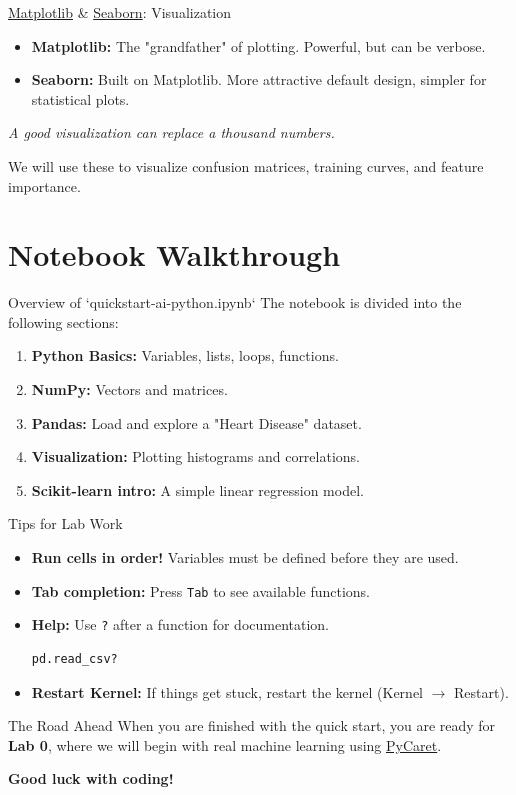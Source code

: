 \documentclass[aspectratio=169]{beamer}
\begin{document}
\begin{frame}{\href{https://matplotlib.org/}{Matplotlib} \& \href{https://seaborn.pydata.org/}{Seaborn}: Visualization}
    \begin{itemize}
        \item \textbf{Matplotlib:} The "grandfather" of plotting. Powerful, but can be verbose.
        \item \textbf{Seaborn:} Built on Matplotlib. More attractive default design, simpler for statistical plots.
    \end{itemize}
    
    \begin{center}
        \textit{A good visualization can replace a thousand numbers.}
    \end{center}
    We will use these to visualize confusion matrices, training curves, and feature importance.
\end{frame}

\section{Notebook Walkthrough}
\begin{frame}{Overview of `quickstart-ai-python.ipynb`}
    The notebook is divided into the following sections:
    \begin{enumerate}
        \item \textbf{Python Basics:} Variables, lists, loops, functions.
        \item \textbf{NumPy:} Vectors and matrices.
        \item \textbf{Pandas:} Load and explore a "Heart Disease" dataset.
        \item \textbf{Visualization:} Plotting histograms and correlations.
        \item \textbf{Scikit-learn intro:} A simple linear regression model.
    \end{enumerate}
\end{frame}

\begin{frame}[fragile]{Tips for Lab Work}
    \begin{itemize}
        \item \textbf{Run cells in order!} Variables must be defined before they are used.
        \item \textbf{Tab completion:} Press \texttt{Tab} to see available functions.
        \item \textbf{Help:} Use \texttt{?} after a function for documentation.
        \begin{lstlisting}[language=Python]
pd.read_csv?
        \end{lstlisting}
        \item \textbf{Restart Kernel:} If things get stuck, restart the kernel (Kernel $\rightarrow$ Restart).
    \end{itemize}
\end{frame}

\begin{frame}{The Road Ahead}
    When you are finished with the quick start, you are ready for \textbf{Lab 0}, where we will begin with real machine learning using \href{https://pycaret.org/}{PyCaret}.
    
    \vspace{1cm}
    \centering
    \textbf{Good luck with coding!}
\end{frame}
\end{document}
